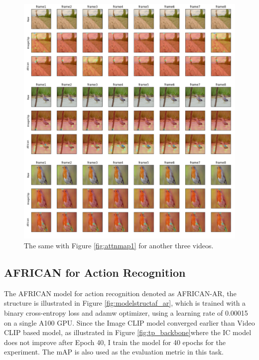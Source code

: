 \begin{figure}[ht]
    \centering
    \includegraphics[width=1.0\textwidth]{assets/imgs/5_4_AttentionMaps_2}
    \caption[Attention Map 1]{The same with Figure \ref{fig:attnmap1} for another three videos.}
    \label{fig:attnmap2}
\end{figure}







\subsection{AFRICAN for Action Recognition}
The AFRICAN model for action recognition denoted as AFRICAN-AR, the structure is illustrated in Figure \ref{fig:modelstructaf_ar}, which is trained with a binary cross-entropy loss and adamw optimizer, using a learning rate of 0.00015 on a single A100 GPU. Since the Image CLIP model converged earlier than Video CLIP based model, as illustrated in Figure \ref{fig:tp_backbone}where the IC model does not improve after Epoch 40, I train the model for 40 epochs for the experiment. The mAP is also used as the evaluation metric in this task.

